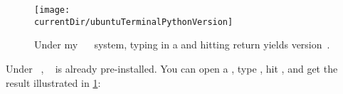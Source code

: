 %
%
\begin{figure}%
\centering%
\texttt{[image: \\currentDir/ubuntuTerminalPythonVersion]}%
\caption{Under my \ubuntu\ \linux~ system, typing  in a  and hitting return yields version~.}%
\label{fig:ubuntuTerminalPythonVersion}%
\end{figure}%
%
\begin{sloppypar}%
Under \ubuntu\ \linux, \python~ is already pre-installed.
You can open a , type , hit \keys{\return}, and get the result illustrated in \cref{fig:ubuntuTerminalPythonVersion}:
\end{sloppypar}%
%
\endhsection%
%
